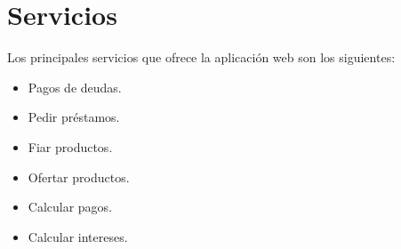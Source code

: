 \section{Servicios}

{Los principales servicios que ofrece la aplicación web son los siguientes:

\begin{itemize}
	\item Pagos de deudas.
	\item Pedir préstamos.
	\item Fiar productos.
	\item Ofertar productos.
	\item Calcular pagos.
	\item Calcular intereses.
\end{itemize}
}